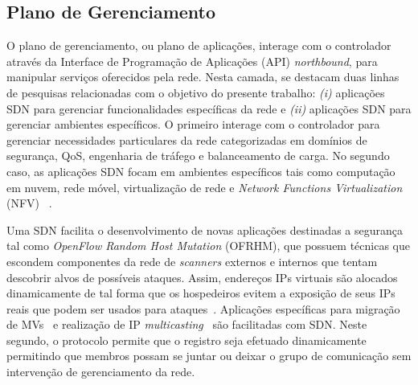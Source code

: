 \subsection{Plano de Gerenciamento}

O plano de gerenciamento, ou plano de aplicações, interage com o controlador através da Interface de Programação de Aplicações (API) \textit{northbound}, para manipular serviços oferecidos pela rede. 
Nesta camada, se destacam duas linhas de pesquisas relacionadas com o objetivo do presente trabalho: \textit{(i)} aplicações SDN para gerenciar funcionalidades específicas da rede e \textit{(ii)} aplicações SDN para gerenciar ambientes específicos. O primeiro interage com o controlador para gerenciar necessidades particulares da rede categorizadas em domínios de segurança, QoS, engenharia de tráfego e balanceamento de carga. No segundo caso, as aplicações SDN focam em ambientes específicos tais como computação em nuvem, rede móvel, virtualização de rede e \emph{Network Functions Virtualization} (NFV) ~\cite{jarraya-2014}.

Uma SDN facilita o desenvolvimento de novas aplicações destinadas a segurança tal como \emph{OpenFlow Random Host Mutation} (OFRHM), que possuem técnicas que escondem componentes da rede de \textit{scanners} externos e internos que tentam descobrir alvos de possíveis ataques. Assim, endereços IPs virtuais são alocados dinamicamente  de tal forma que os hospedeiros evitem a exposição de seus IPs reais que podem ser usados para ataques~\cite{jafarian-2012}. Aplicações específicas para migração de MVs~\cite{ghorbani-2012} e realização de IP \textit{multicasting}~\cite{nakagawa2012} são facilitadas com SDN. Neste segundo, o protocolo permite que o registro seja efetuado dinamicamente permitindo que membros possam se juntar ou deixar o grupo de comunicação sem intervenção de gerenciamento da rede.

